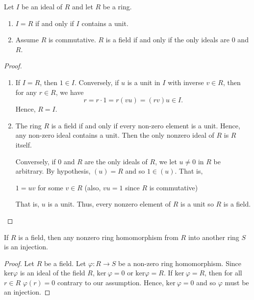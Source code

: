 \begin{prop}
   Let \( I  \) be an ideal of \( R  \) and let \( R  \) be a ring. 

   \begin{enumerate}
       \item[(1)] \( I  =R  \) if and only if \( I  \) contains a unit.
        \item[(2)] Assume \( R  \) is commutative. \( R  \) is a field if and only if the only ideals are \(  0  \) and \( R  \).
   \end{enumerate}
\end{prop}
\begin{proof}
\begin{enumerate}
    \item[(1)] If \( I = R  \), then \( 1 \in I  \). Conversely, if \( u  \) is a unit in \( I  \) with inverse \( v \in R  \), then for any \( r \in R  \), we have 
        \[  r = r \cdot 1 = r (vu) = (rv) u \in I.  \]
        Hence, \( R = I  \).
    \item[(2)] The ring \( R  \) is a field if and only if every non-zero element is a unit. Hence, any non-zero ideal contains a unit. Then the only nonzero ideal of \( R  \) is \( R  \) itself.

        Conversely, if \( 0  \) and \( R  \) are the only ideals of \( R  \), we let \( u \neq 0  \) in \( R  \) be arbitrary. By hypothesis, \( (u) = R  \) and so \( 1 \in (u) \). That is, 
        \begin{center}
            \( 1 = uv  \) for some \( v \in R  \) (also, \( vu = 1  \) since \( R  \) is commutative)
        \end{center}
        That is, \( u  \) is a unit. Thus, every nonzero element of \( R  \) is a unit so \( R  \) is a field.

\end{enumerate}
\end{proof}

\begin{corollary}
    If \( R  \) is a field, then any nonzero ring homomorphism from \( R  \) into another ring \( S  \) is an injection.
\end{corollary}
\begin{proof}
Let \( R  \) be a field. Let \( \varphi: R \to S  \) be a non-zero ring homomorphism. Since \( \text{ker}\varphi   \) is an ideal of the field \( R  \), \( \text{ker} \ \varphi = 0    \) or \( \text{ker} \varphi = R   \). If \( \text{ker} \ \varphi = R   \), then for all \( r \in R  \) \( \varphi(r) = 0  \) contrary to our assumption. Hence, \( \text{ker} \ \varphi = 0    \) and so \( \varphi  \) must be an injection.
\end{proof}

